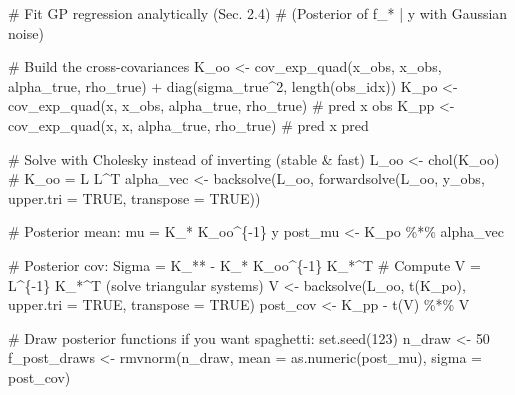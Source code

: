 \documentclass[
  letterpaper,
  DIV=11,
  numbers=noendperiod]{scrartcl}
\newenvironment{Shaded}{\begin{snugshade}}{\end{snugshade}}
\newcommand{\AttributeTok}[1]{\textcolor[rgb]{0.40,0.45,0.13}{#1}}
\newcommand{\CommentTok}[1]{\textcolor[rgb]{0.37,0.37,0.37}{#1}}
\newcommand{\ConstantTok}[1]{\textcolor[rgb]{0.56,0.35,0.01}{#1}}
\newcommand{\DecValTok}[1]{\textcolor[rgb]{0.68,0.00,0.00}{#1}}
\newcommand{\FunctionTok}[1]{\textcolor[rgb]{0.28,0.35,0.67}{#1}}
\newcommand{\NormalTok}[1]{\textcolor[rgb]{0.00,0.23,0.31}{#1}}
\newcommand{\OtherTok}[1]{\textcolor[rgb]{0.00,0.23,0.31}{#1}}
\newcommand{\SpecialCharTok}[1]{\textcolor[rgb]{0.37,0.37,0.37}{#1}}
\begin{document}
\begin{Shaded}
\begin{Highlighting}[]
\CommentTok{\# Fit GP regression analytically (Sec. 2.4)}
\CommentTok{\#     (Posterior of f\_* | y with Gaussian noise)}

\CommentTok{\# Build the cross{-}covariances}
\NormalTok{K\_oo }\OtherTok{\textless{}{-}} \FunctionTok{cov\_exp\_quad}\NormalTok{(x\_obs, x\_obs, alpha\_true, rho\_true) }\SpecialCharTok{+} \FunctionTok{diag}\NormalTok{(sigma\_true}\SpecialCharTok{\^{}}\DecValTok{2}\NormalTok{, }\FunctionTok{length}\NormalTok{(obs\_idx))}
\NormalTok{K\_po }\OtherTok{\textless{}{-}} \FunctionTok{cov\_exp\_quad}\NormalTok{(x, x\_obs, alpha\_true, rho\_true)   }\CommentTok{\# pred x obs}
\NormalTok{K\_pp }\OtherTok{\textless{}{-}} \FunctionTok{cov\_exp\_quad}\NormalTok{(x, x, alpha\_true, rho\_true)       }\CommentTok{\# pred x pred}

\CommentTok{\# Solve with Cholesky instead of inverting (stable \& fast)}
\NormalTok{L\_oo }\OtherTok{\textless{}{-}} \FunctionTok{chol}\NormalTok{(K\_oo)                                     }\CommentTok{\# K\_oo = L L\^{}T}
\NormalTok{alpha\_vec }\OtherTok{\textless{}{-}} \FunctionTok{backsolve}\NormalTok{(L\_oo, }\FunctionTok{forwardsolve}\NormalTok{(L\_oo, y\_obs, }\AttributeTok{upper.tri =} \ConstantTok{TRUE}\NormalTok{, }\AttributeTok{transpose =} \ConstantTok{TRUE}\NormalTok{))}

\CommentTok{\# Posterior mean: mu = K\_* K\_oo\^{}\{{-}1\} y}
\NormalTok{post\_mu }\OtherTok{\textless{}{-}}\NormalTok{ K\_po }\SpecialCharTok{\%*\%}\NormalTok{ alpha\_vec}

\CommentTok{\# Posterior cov:  Sigma = K\_** {-} K\_* K\_oo\^{}\{{-}1\} K\_*\^{}T}
\CommentTok{\# Compute V = L\^{}\{{-}1\} K\_*\^{}T  (solve triangular systems)}
\NormalTok{V }\OtherTok{\textless{}{-}} \FunctionTok{backsolve}\NormalTok{(L\_oo, }\FunctionTok{t}\NormalTok{(K\_po), }\AttributeTok{upper.tri =} \ConstantTok{TRUE}\NormalTok{, }\AttributeTok{transpose =} \ConstantTok{TRUE}\NormalTok{)}
\NormalTok{post\_cov }\OtherTok{\textless{}{-}}\NormalTok{ K\_pp }\SpecialCharTok{{-}} \FunctionTok{t}\NormalTok{(V) }\SpecialCharTok{\%*\%}\NormalTok{ V}

\CommentTok{\# Draw posterior functions if you want spaghetti:}
\FunctionTok{set.seed}\NormalTok{(}\DecValTok{123}\NormalTok{)}
\NormalTok{n\_draw }\OtherTok{\textless{}{-}} \DecValTok{50}
\NormalTok{f\_post\_draws }\OtherTok{\textless{}{-}} \FunctionTok{rmvnorm}\NormalTok{(n\_draw, }\AttributeTok{mean =} \FunctionTok{as.numeric}\NormalTok{(post\_mu), }\AttributeTok{sigma =}\NormalTok{ post\_cov)}


\end{Highlighting}
\end{Shaded}
\end{document}
